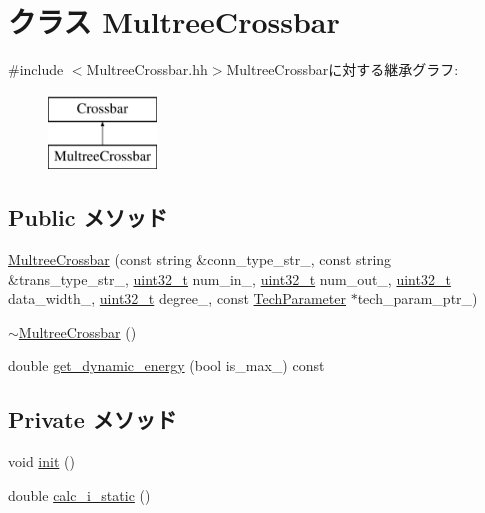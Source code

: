 \hypertarget{classMultreeCrossbar}{
\section{クラス MultreeCrossbar}
\label{classMultreeCrossbar}
}


{\ttfamily \#include $<$MultreeCrossbar.hh$>$}MultreeCrossbarに対する継承グラフ:\begin{figure}[H]
\begin{center}
\leavevmode
\includegraphics[height=2cm]{classMultreeCrossbar}
\end{center}
\end{figure}
\subsection*{Public メソッド}
\begin{DoxyCompactItemize}
\item 
\hyperlink{classMultreeCrossbar_a3c72c228bf72e9815ff90b3ad1fe74fb}{MultreeCrossbar} (const string \&conn\_\-type\_\-str\_\-, const string \&trans\_\-type\_\-str\_\-, \hyperlink{Type_8hh_a435d1572bf3f880d55459d9805097f62}{uint32\_\-t} num\_\-in\_\-, \hyperlink{Type_8hh_a435d1572bf3f880d55459d9805097f62}{uint32\_\-t} num\_\-out\_\-, \hyperlink{Type_8hh_a435d1572bf3f880d55459d9805097f62}{uint32\_\-t} data\_\-width\_\-, \hyperlink{Type_8hh_a435d1572bf3f880d55459d9805097f62}{uint32\_\-t} degree\_\-, const \hyperlink{classTechParameter}{TechParameter} $\ast$tech\_\-param\_\-ptr\_\-)
\item 
\hyperlink{classMultreeCrossbar_a2f3440d960819851a8c2bd0599eb5bde}{$\sim$MultreeCrossbar} ()
\item 
double \hyperlink{classMultreeCrossbar_a912bfef03e3ce71b4bbc0b5136b087f5}{get\_\-dynamic\_\-energy} (bool is\_\-max\_\-) const 
\end{DoxyCompactItemize}
\subsection*{Private メソッド}
\begin{DoxyCompactItemize}
\item 
void \hyperlink{classMultreeCrossbar_a02fd73d861ef2e4aabb38c0c9ff82947}{init} ()
\item 
double \hyperlink{classMultreeCrossbar_a0027807356ac4ca07fe2e593234eb884}{calc\_\-i\_\-static} ()
\end{DoxyCompactItemize}

